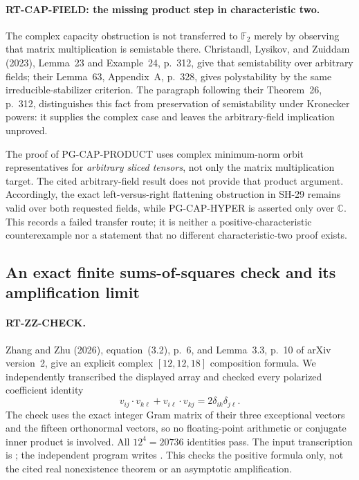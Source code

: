 \paragraph{RT-CAP-FIELD: the missing product step in characteristic two.}
The complex capacity obstruction is not transferred to $\mathbb F_2$
merely by observing that matrix multiplication is semistable there.
Christandl, Lysikov, and Zuiddam (2023), Lemma~23 and Example~24,
p.~312, give that semistability over arbitrary fields; their
Lemma~63, Appendix~A, p.~328, gives polystability by the same
irreducible-stabilizer criterion. The paragraph following their
Theorem~26, p.~312, distinguishes this fact from preservation of
semistability under Kronecker powers: it supplies the complex case
and leaves the arbitrary-field implication unproved.

The proof of PG-CAP-PRODUCT uses complex minimum-norm orbit
representatives for \emph{arbitrary sliced tensors}, not only the
matrix multiplication target. The cited arbitrary-field result does
not provide that product argument. Accordingly, the exact
left-versus-right flattening obstruction in SH-29 remains valid
over both requested fields, while PG-CAP-HYPER is asserted only
over $\mathbb C$. This records a failed transfer route; it is neither
a positive-characteristic counterexample nor a statement that no
different characteristic-two proof exists.

\subsection{An exact finite sums-of-squares check and its amplification limit}

\paragraph{RT-ZZ-CHECK.}
Zhang and Zhu (2026), equation~(3.2), p.~6, and Lemma~3.3,
p.~10 of arXiv version~2, give an explicit complex
$[12,12,18]$ composition formula. We independently transcribed
the displayed array and checked every polarized coefficient identity
\[
 v_{ij}\mathbin{\cdot}v_{k\ell}
 +v_{i\ell}\mathbin{\cdot}v_{kj}=2\delta_{ik}\delta_{j\ell}.
\]
The check uses the exact integer Gram matrix of their three exceptional
vectors and the fifteen orthonormal vectors, so no floating-point
arithmetic or conjugate inner product is involved.
All $12^4=20736$ identities pass. The input transcription is
; the independent program
 writes
.
This checks the positive formula only, not the cited real nonexistence
theorem or an asymptotic amplification.

